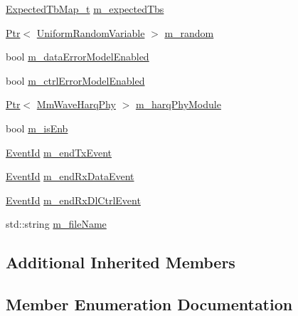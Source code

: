 \begin{DoxyCompactItemize}
\hyperlink{namespacens3_aa991639a7596b7ba936e9e7d3a8b4058}{Expected\+Tb\+Map\+\_\+t} \hyperlink{classns3_1_1MmWaveSpectrumPhy_a596e02208ad8258c0bbc41bb26df7d6c}{m\+\_\+expected\+Tbs}
\item 
\hyperlink{classns3_1_1Ptr}{Ptr}$<$ \hyperlink{classns3_1_1UniformRandomVariable}{Uniform\+Random\+Variable} $>$ \hyperlink{classns3_1_1MmWaveSpectrumPhy_a18c1ec685e2ead5bf3edbf40fbfa0fa4}{m\+\_\+random}
\item 
bool \hyperlink{classns3_1_1MmWaveSpectrumPhy_a7a5d1549e8a4692b15a504f41716206c}{m\+\_\+data\+Error\+Model\+Enabled}
\item 
bool \hyperlink{classns3_1_1MmWaveSpectrumPhy_a8f914f502278f1a8f3d2d47f770d8b28}{m\+\_\+ctrl\+Error\+Model\+Enabled}
\item 
\hyperlink{classns3_1_1Ptr}{Ptr}$<$ \hyperlink{classns3_1_1MmWaveHarqPhy}{Mm\+Wave\+Harq\+Phy} $>$ \hyperlink{classns3_1_1MmWaveSpectrumPhy_a88d377424f8b4ca9745807ef3281e010}{m\+\_\+harq\+Phy\+Module}
\item 
bool \hyperlink{classns3_1_1MmWaveSpectrumPhy_ab67061dc2a2ff96f7dbcb3220b3eab3f}{m\+\_\+is\+Enb}
\item 
\hyperlink{classns3_1_1EventId}{Event\+Id} \hyperlink{classns3_1_1MmWaveSpectrumPhy_ac51d627851d6d8021cb5404059a78ff2}{m\+\_\+end\+Tx\+Event}
\item 
\hyperlink{classns3_1_1EventId}{Event\+Id} \hyperlink{classns3_1_1MmWaveSpectrumPhy_ab9c185cb4f5df01aef9f9cb81ae20125}{m\+\_\+end\+Rx\+Data\+Event}
\item 
\hyperlink{classns3_1_1EventId}{Event\+Id} \hyperlink{classns3_1_1MmWaveSpectrumPhy_a0260d60dc84913dd1bad264c999aa2b3}{m\+\_\+end\+Rx\+Dl\+Ctrl\+Event}
\item 
std\+::string \hyperlink{classns3_1_1MmWaveSpectrumPhy_a110a83ea3c1e05677e0ce5e5b333b0f5}{m\+\_\+file\+Name}
\end{DoxyCompactItemize}
\subsection*{Additional Inherited Members}


\subsection{Member Enumeration Documentation}
